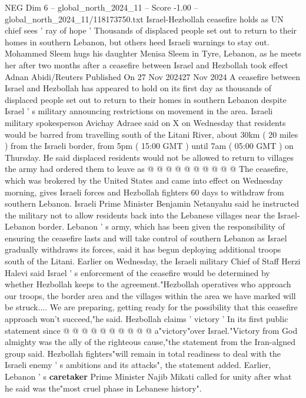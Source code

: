 \begin{textsample}{NEG Dim 6 – global\_north\_2024\_11 – Score -1.00 – global\_north\_2024\_11/118173750.txt}  \label{ex:f6_neg_159}
Israel-Hezbollah ceasefire holds as UN chief sees ' ray of hope ' Thousands of displaced people set out to return to their homes in southern Lebanon, but others heed Israeli warnings to stay out.
Mohammed Sleem hugs his daughter Menisa Sleem in Tyre, Lebanon, as he meets her after two months after a ceasefire between Israel and Hezbollah took effect Adnan Abidi/Reuters Published On 27 Nov 202427 Nov 2024 A ceasefire between Israel and Hezbollah has appeared to hold on its first day as thousands of displaced people set out to return to their homes in southern Lebanon despite Israel ' s military announcing restrictions on movement in the area.
Israeli military spokesperson Avichay Adraee said on X on Wednesday that residents would be barred from travelling south of the Litani River, about 30km ( 20 miles ) from the Israeli border, from 5pm ( 15:00 GMT ) until 7am ( 05:00 GMT ) on Thursday.
He said displaced residents would not be allowed to return to villages the army had ordered them to leave as @ @ @ @ @ @ @ @ @ @ The ceasefire, which was brokered by the United States and came into effect on Wednesday morning, gives Israeli forces and Hezbollah fighters 60 days to withdraw from southern Lebanon.
Israeli Prime Minister Benjamin Netanyahu said he instructed the military not to allow residents back into the Lebanese villages near the Israel-Lebanon border.
Lebanon ' s army, which has been given the responsibility of ensuring the ceasefire lasts and will take control of southern Lebanon as Israel gradually withdraws its forces, said it has begun deploying additional troops south of the Litani.
Earlier on Wednesday, the Israeli military Chief of Staff Herzi Halevi said Israel ' s enforcement of the ceasefire would be determined by whether Hezbollah keeps to the agreement."Hezbollah operatives who approach our troops, the border area and the villages within the area we have marked will be struck....
We are preparing, getting ready for the possibility that this ceasefire approach won't succeed,"he said.
Hezbollah claims ' victory ' In its first public statement since @ @ @ @ @ @ @ @ @ @ a"victory"over Israel."Victory from God almighty was the ally of the righteous cause,"the statement from the Iran-algned group said.
Hezbollah fighters"will remain in total readiness to deal with the Israeli enemy ' s ambitions and its attacks", the statement added.
Earlier, Lebanon ' s \textbf{caretaker} Prime Minister Najib Mikati called for unity after what he said was the"most cruel phase in Lebanese history".

\end{textsample}
